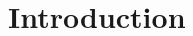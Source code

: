 \documentclass[10pt]{thesis}
\author{Ricard Lado Roigé}
\begin{document}
	\titlepage             %
	\clearpage\mbox{}\clearpage %
	\copyrightpage         %
	\tableofcontents       %
	\listoffigures         %


	\chapter{Introduction}
	


	\begin{singlespace}
		\begin{thebibliography}{99}
			
		\end{thebibliography}
	\end{singlespace}
\end{document}
